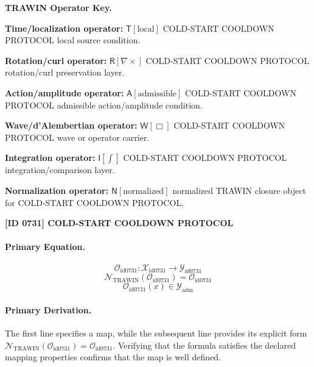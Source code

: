 \par\vspace{0.45\baselineskip}
\noindent\begin{minipage}[t]{\linewidth}
\begingroup
\small
\raggedright
\textbf{TRAWIN Operator Key.}\par
\noindent\textbf{Time/localization operator:} $\mathsf{T}\!\left[\mathrm{local}\right]$ COLD-START COOLDOWN PROTOCOL local source condition.\par
\noindent\textbf{Rotation/curl operator:} $\mathsf{R}\!\left[\nabla\times\right]$ COLD-START COOLDOWN PROTOCOL rotation/curl preservation layer.\par
\noindent\textbf{Action/amplitude operator:} $\mathsf{A}\!\left[\mathrm{admissible}\right]$ COLD-START COOLDOWN PROTOCOL admissible action/amplitude condition.\par
\noindent\textbf{Wave/d'Alembertian operator:} $\mathsf{W}\!\left[\Box\right]$ COLD-START COOLDOWN PROTOCOL wave or operator carrier.\par
\noindent\textbf{Integration operator:} $\mathsf{I}\!\left[\int\right]$ COLD-START COOLDOWN PROTOCOL integration/comparison layer.\par
\noindent\textbf{Normalization operator:} $\mathsf{N}\!\left[\mathrm{normalized}\right]$ normalized TRAWIN closure object for COLD-START COOLDOWN PROTOCOL.\par
\endgroup
\end{minipage}

\clearpage
\noindent\textbf{[ID 0731] COLD-START COOLDOWN PROTOCOL}\par
\vspace{0.35em}
\paragraph{Primary Equation.}
\[
\mathcal{O}_{\mathrm{id0731}}:\mathcal{X}_{\mathrm{id0731}}\longrightarrow\mathcal{Y}_{\mathrm{id0731}}
\]
\[
\mathcal{N}_{\mathrm{TRAWIN}}(\mathcal{O}_{\mathrm{id0731}})=\mathcal{O}_{\mathrm{id0731}}
\]
\[
\mathcal{O}_{\mathrm{id0731}}(x)\in\mathcal{Y}_{\mathrm{adm}}
\]

\paragraph{Primary Derivation.}
The first line specifies a map, while the subsequent line provides its explicit form \( \mathcal{N}_{\mathrm{TRAWIN}}(\mathcal{O}_{\mathrm{id0731}})=\mathcal{O}_{\mathrm{id0731}} \). Verifying that the formula satisfies the declared mapping properties confirms that the map is well defined.
